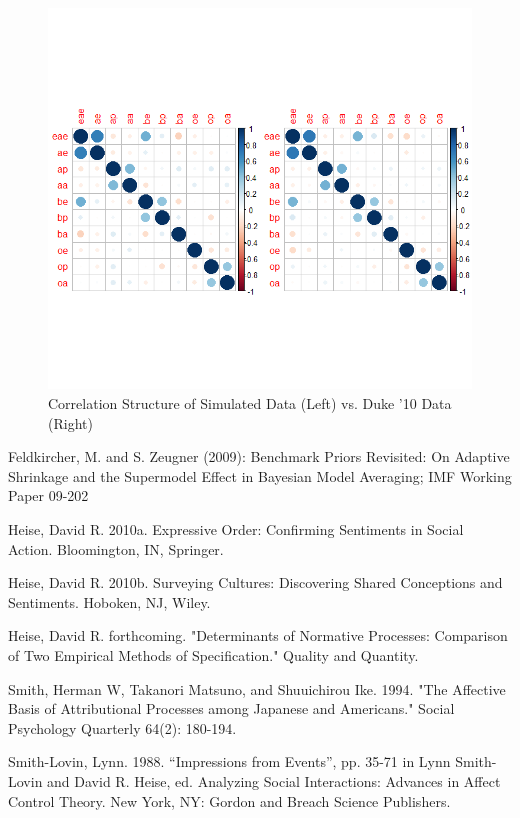 \documentclass[]{article}
\begin{document}
\begin{figure}[h]
\caption{Correlation Structure of Simulated Data (Left) vs. Duke '10 Data (Right)}
\includegraphics[width = 1.1\textwidth]{structure.png}
\end{figure}




\begin{thebibliography}{9}

Feldkircher, M. and S. Zeugner (2009): Benchmark Priors Revisited: On Adaptive Shrinkage and the Supermodel Effect in Bayesian Model Averaging; IMF Working Paper 09-202

	Heise, David R.
  2010a. Expressive Order: Confirming Sentiments in Social Action. Bloomington, IN, Springer.
  
  Heise, David R. 2010b. Surveying Cultures: Discovering Shared Conceptions and Sentiments. Hoboken, NJ, Wiley.
  
  Heise, David R. forthcoming. "Determinants of Normative Processes: Comparison of Two Empirical Methods of Specification." Quality and Quantity.
  
  Smith, Herman W, Takanori Matsuno, and Shuuichirou Ike. 1994. "The Affective Basis of Attributional Processes among Japanese and Americans." Social Psychology Quarterly 64(2): 180-194.
  
  Smith-Lovin, Lynn. 1988. “Impressions from Events”, pp. 35-71 in Lynn Smith-Lovin and David R. Heise, ed. Analyzing Social Interactions: Advances in Affect Control Theory. New York, NY: Gordon and Breach Science Publishers.
  
  
\end{thebibliography}
\end{document}
